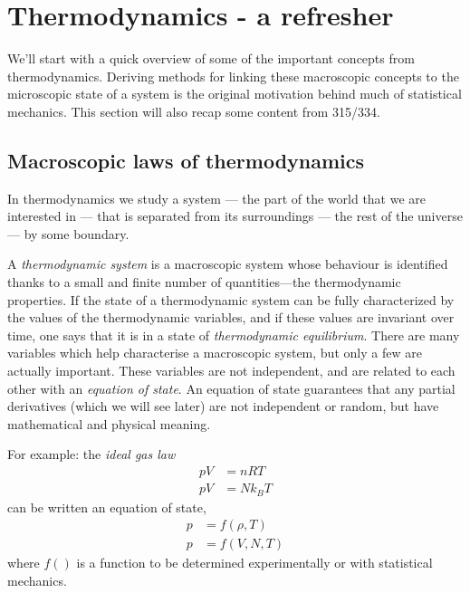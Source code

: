 \section{Thermodynamics - a refresher}
We'll start with a quick overview of some of the important concepts from thermodynamics. Deriving methods for linking these macroscopic concepts to the microscopic state of a system is the original motivation behind much of statistical mechanics. This section will also recap some content from 315/334.

\subsection{Macroscopic laws of thermodynamics}
In thermodynamics we study a system --- the part of the world that we are interested in --- that is separated from its surroundings --- the rest of the universe --- by some boundary.


A \textit{thermodynamic system} is a macroscopic system whose behaviour is identified thanks to a small and finite number of quantities—the thermodynamic properties. If the state of a thermodynamic system can be fully characterized by the values of the thermodynamic variables, and if these values are invariant over time, one says that it is in a state of \textit{thermodynamic equilibrium}. There are many variables which help characterise a macroscopic system, but only a few are actually important. These variables are not independent, and are related to each other with an \textit{equation of state}. An equation of state guarantees that any partial derivatives (which we will see later) are not independent or random, but have mathematical and physical meaning.


For example: the \textit{ideal gas law}
\begin{align*}
pV &= nRT \\
pV &= Nk_{B}T
\end{align*}
can be written an equation of state,
\begin{align*}
p &= f(\rho, T) \\
p &= f(V, N, T)
\end{align*}
where $f()$ is a function to be determined experimentally or with statistical mechanics.

